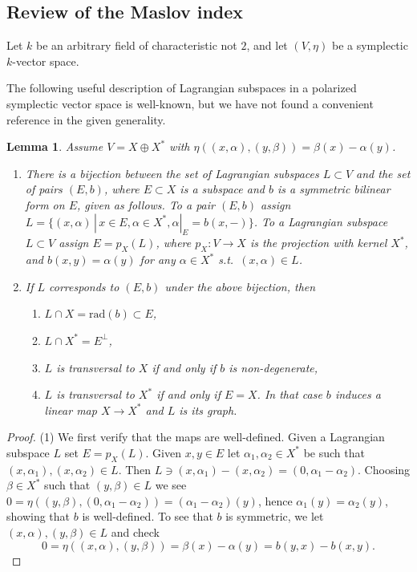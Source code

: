 \documentclass{article}
\newtheorem{lem}[thm]{Lemma}
\theoremstyle{definition}
\numberwithin{equation}{subsection}
\renewcommand{\-}{\hyp{}}
\begin{document}
\begin{appendices}
\subsection{Review of the Maslov index}

Let $k$ be an arbitrary field of characteristic not $2$, and let $(V,\eta)$ be a symplectic $k$-vector space. 


The following useful description of Lagrangian subspaces in a polarized symplectic vector space is well-known, but we have not found a convenient reference in the given generality.

\begin{lem} \label{lem:lagpol}
	Assume $V=X \oplus X^*$ with $\eta((x,\alpha),(y,\beta))=\beta(x)-\alpha(y)$. 
	\begin{enumerate}
		\item There is a bijection between the set of Lagrangian subspaces $L \subset V$ and the set of pairs $(E,b)$, where $E \subset X$ is a subspace and $b$ is a symmetric bilinear form on $E$, given as follows. To a pair $(E,b)$ assign $L=\{(x,\alpha) \, | \, x \in E, \alpha \in X^*, \alpha|_E=b(x,-)\}$. To a Lagrangian subspace $L \subset V$ assign $E=p_X(L)$, where $p_X : V \to X$ is the projection with kernel $X^*$, and $b(x,y)=\alpha(y)$ for any $\alpha \in X^*$ s.t.\ $(x,\alpha) \in L$.
		\item If $L$ corresponds to $(E,b)$ under the above bijection, then
		\begin{enumerate}
			\item $L \cap X=\mathrm{rad}(b) \subset E$,
			\item $L \cap X^*=E^\perp$,
			\item $L$ is transversal to $X$ if and only if  $b$ is non-degenerate,
			\item $L$ is transversal to $X^*$ if and only if $E=X$. In that case $b$ induces a linear map $X \to X^*$ and $L$ is its graph.
		\end{enumerate}
	\end{enumerate}
	
\end{lem}
\begin{proof} 
	(1) We first verify that the maps are well-defined. Given a Lagrangian subspace $L$ set $E=p_X(L)$. Given $x,y \in E$ let $\alpha_1,\alpha_2 \in X^*$ be such that $(x,\alpha_1),(x,\alpha_2) \in L$. Then $L \ni (x,\alpha_1) - (x,\alpha_2) = (0,\alpha_1-\alpha_2)$. Choosing $\beta \in X^*$ such that $(y,\beta) \in L$ we see $0=\eta((y,\beta),(0,\alpha_1-\alpha_2))=(\alpha_1-\alpha_2)(y)$, hence $\alpha_1(y)=\alpha_2(y)$, showing that $b$ is well-defined. To see that $b$ is symmetric, we let $(x,\alpha),(y,\beta) \in L$ and check
	\[ 0=\eta((x,\alpha),(y,\beta))=\beta(x)-\alpha(y) = b(y,x)-b(x,y). \]


\end{proof}
\end{appendices}
\end{document}
